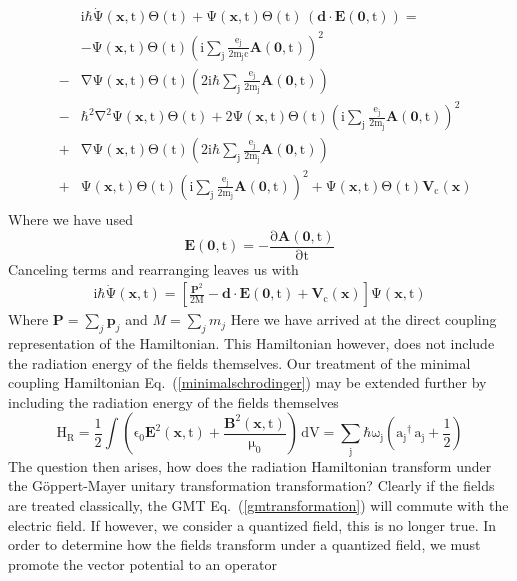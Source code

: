 \documentclass[twocolumn,english,pra,aps,superscriptaddress,floatfix]{revtex4-1}
\begin{document}
\begin{eqnarray}
&&\mathrm{\mathrm{i}\mathrm{\hbar}\dot{\Psi}(\mathbf{x},t)\Theta(t)+\Psi(\mathbf{x},t)\Theta(t)\,\left(\mathbf{d}\cdot\mathbf{E}(\mathbf{0},t)\right)=}\nonumber \\
&&\mathrm{-\Psi(\mathbf{x},t)\Theta(t)\left(i\sum_j\frac{e_j}{2m_jc}\mathbf{A}(\mathbf{0},t)\right)^2}\nonumber \\
&-&\mathrm{\nabla\Psi(\mathbf{x},t)\Theta(t)\left(2i\hbar\sum_j\frac{e_j}{2m_j}\mathbf{A}(\mathbf{0},t)\right)}\nonumber \\
&-&\mathrm{\hbar^2\nabla^2\Psi(\mathbf{x},t)\Theta(t)+2\Psi(\mathbf{x},t)\Theta(t)\left(i\sum_j\frac{e_j}{2m_j}\mathbf{A}(\mathbf{0},t)\right)^2}\nonumber \\
&+&\mathrm{\nabla\Psi(\mathbf{x},t)\Theta(t)\left(2i\hbar\sum_j\frac{e_j}{2m_j}\mathbf{A}(\mathbf{0},t)\right)}\nonumber \\
&+&\mathrm{\Psi(\mathbf{x},t)\Theta(t)\left(i\sum_j\frac{e_j}{2m_j}\mathbf{A}(\mathbf{0},t)\right)^2 +\Psi(\mathbf{x},t)\Theta(t)\mathbf{V}_c(\mathbf{x})}\nonumber \\
\end{eqnarray}
Where we have used 
\begin{equation}
\mathrm{\mathbf{E}(\mathbf{0},t)=-\frac{\partial \mathbf{A}(\mathbf{0},t)}{\partial t}}
\label{constitutive1}
\end{equation}
Canceling terms and rearranging leaves us with
\begin{eqnarray}
\mathrm{i\hbar\dot{\Psi}(\mathbf{x},t)=\left[\frac{\mathbf{P}^2}{2M}-\mathbf{d}\cdot\mathbf{E}(\mathbf{0},t)+\mathbf{V}_c(\mathbf{x})\right]\Psi(\mathbf{x},t)}
\label{directschrodinger}
\end{eqnarray}
Where $\mathbf{P}=\sum_j\mathbf{p}_j$ and $M=\sum_j m_j$
Here we have arrived at the direct coupling representation of the Hamiltonian. This Hamiltonian however, does not include the radiation energy of the fields themselves. Our treatment of the minimal coupling Hamiltonian Eq.\ (\ref{minimalschrodinger}) may be extended further by including the radiation energy of the fields themselves
\begin{equation}
\mathrm{H_R=\frac{1}{2}\int\left( \epsilon_0\mathbf{E}^2(\mathbf{x},t)+\frac{\mathbf{B}^2(\mathbf{x},t)}{\mu_0}\right)\,dV=\sum_j\hbar\omega_j\left({a_j}^{\dagger}\, a_j+\frac{1}{2}\right)}
\end{equation}
The question then arises, how does the radiation Hamiltonian transform under the G\"{o}ppert-Mayer unitary transformation transformation? Clearly if the fields are treated classically, the GMT Eq.\ (\ref{gmtransformation}) will commute with the electric field.  If however, we consider a quantized field, this is no longer true. In order to determine how the fields transform under a quantized field, we must promote the vector potential to an operator \cite{thirunamachandran}
\end{document}

